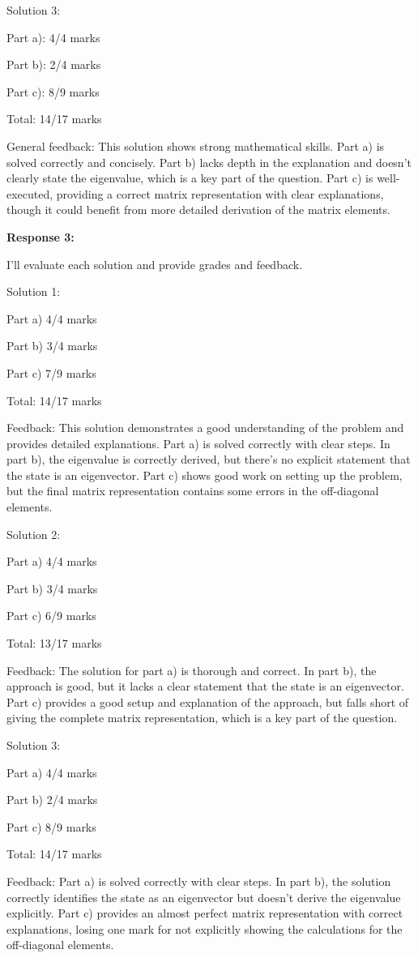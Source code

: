 \documentclass[a4paper,11pt]{article}
\begin{document}
Solution 3:

Part a): 4/4 marks

Part b): 2/4 marks

Part c): 8/9 marks

Total: 14/17 marks

General feedback: This solution shows strong mathematical skills. Part a) is solved correctly and concisely. Part b) lacks depth in the explanation and doesn't clearly state the eigenvalue, which is a key part of the question. Part c) is well-executed, providing a correct matrix representation with clear explanations, though it could benefit from more detailed derivation of the matrix elements.

\bigskip
\textbf{Response 3:}

I'll evaluate each solution and provide grades and feedback.

Solution 1:

Part a) 4/4 marks

Part b) 3/4 marks

Part c) 7/9 marks

Total: 14/17 marks

Feedback: This solution demonstrates a good understanding of the problem and provides detailed explanations. Part a) is solved correctly with clear steps. In part b), the eigenvalue is correctly derived, but there's no explicit statement that the state is an eigenvector. Part c) shows good work on setting up the problem, but the final matrix representation contains some errors in the off-diagonal elements.

Solution 2:

Part a) 4/4 marks

Part b) 3/4 marks

Part c) 6/9 marks

Total: 13/17 marks

Feedback: The solution for part a) is thorough and correct. In part b), the approach is good, but it lacks a clear statement that the state is an eigenvector. Part c) provides a good setup and explanation of the approach, but falls short of giving the complete matrix representation, which is a key part of the question.

Solution 3:

Part a) 4/4 marks

Part b) 2/4 marks

Part c) 8/9 marks

Total: 14/17 marks

Feedback: Part a) is solved correctly with clear steps. In part b), the solution correctly identifies the state as an eigenvector but doesn't derive the eigenvalue explicitly. Part c) provides an almost perfect matrix representation with correct explanations, losing one mark for not explicitly showing the calculations for the off-diagonal elements.
\end{document}
